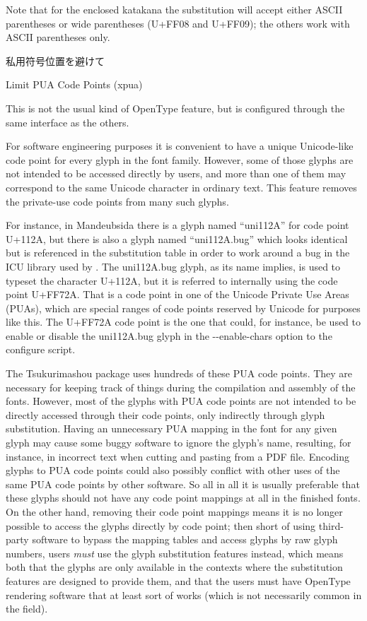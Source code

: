 \documentclass[14pt]{extarticle}
\newcommand{\blsubsection}[2]{%
\kaku\large#1\qquad\phantomsection%
\addcontentsline{toc}{subsection}{#1 #2}%
#2\par\addpenalty{-300}\normalsize}
\begin{document}
Note that for the enclosed katakana the substitution will accept either
ASCII parentheses or
wide parentheses (U+FF08 and U+FF09); the others work with ASCII
parentheses only.


\blsubsection{私用符号位置を避けて}{Limit PUA Code Points (xpua)}

This is not the usual kind of OpenType feature, but is configured through
the same interface as the others.

For software engineering purposes it is convenient to have a unique
Unicode-like code point for every glyph in the font family.  However, some
of those glyphs are not intended to be accessed directly by users, and more
than one of them may correspond to the same Unicode character in ordinary
text.  This feature removes the private-use code points from many such
glyphs.

For instance, in Mandeubsida there is a glyph named ``uni112A'' for code
point U+112A, but there is also a glyph named ``uni112A.bug'' which looks
identical but is referenced in the substitution table in order to work
around a bug in the ICU library used by \XeTeX.  The uni112A.bug glyph, as
its name implies, is used to typeset the character U+112A, but it is
referred to internally using the code point U+FF72A.  That is a code point
in one of the Unicode Private Use Areas (PUAs), which are special ranges of
code points reserved by Unicode for purposes like this.  The U+FF72A code
point is the one that could, for instance, be used to enable or disable the
uni112A.bug glyph in the -{}-enable-chars option to the configure script.

The Tsukurimashou package uses hundreds of these PUA code points.  They are
necessary for keeping track of things during the compilation and assembly of
the fonts.  However, most of the glyphs with PUA code points are not
intended to be directly accessed through their code points, only indirectly
through glyph substitution.  Having an unnecessary PUA mapping in the font
for any given glyph may cause some buggy software to ignore the glyph's
name, resulting, for instance, in incorrect text when cutting and pasting
from a PDF file.  Encoding glyphs to PUA code points could also possibly
conflict with other uses of the same PUA code points by other software.  So
all in all it is usually preferable that these glyphs should not have any
code point mappings at all in the finished fonts.  On the other hand,
removing their code point mappings means it is no longer possible to access
the glyphs directly by code point; then short of using third-party software
to bypass the mapping tables and access glyphs by raw glyph numbers, users
\emph{must} use the glyph substitution features instead, which means both
that the glyphs are only available in the contexts where the substitution
features are designed to provide them, and that the users must have OpenType
rendering software that at least sort of works (which is not necessarily
common in the field).
\end{document}
